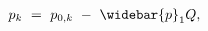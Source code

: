 \begin{equation}
\begin{split}
	p_{k} \
	& = \ p_{0,k} \ - \ \widebar{p}_{1} Q,
\end{split}
\label{Equation:Firms-Problem_Oil-Prices}
\end{equation}